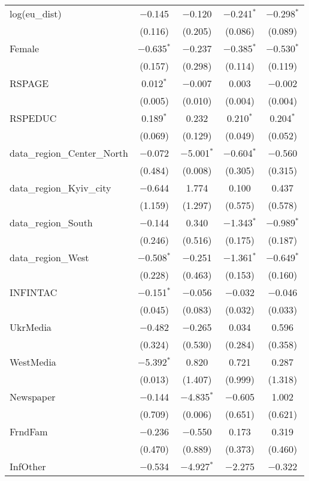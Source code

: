 \begin{table}[!htbp]
\begin{tabular}{@{\extracolsep{1pt}}lcccc}
  log(eu\_dist) & $-$0.145 & $-$0.120 & $-$0.241$^{*}$ & $-$0.298$^{*}$ \\ 
  & (0.116) & (0.205) & (0.086) & (0.089) \\ 
  Female & $-$0.635$^{*}$ & $-$0.237 & $-$0.385$^{*}$ & $-$0.530$^{*}$ \\ 
  & (0.157) & (0.298) & (0.114) & (0.119) \\ 
  RSPAGE & 0.012$^{*}$ & $-$0.007 & 0.003 & $-$0.002 \\ 
  & (0.005) & (0.010) & (0.004) & (0.004) \\ 
  RSPEDUC & 0.189$^{*}$ & 0.232 & 0.210$^{*}$ & 0.204$^{*}$ \\ 
  & (0.069) & (0.129) & (0.049) & (0.052) \\ 
  data\_region\_Center\_North & $-$0.072 & $-$5.001$^{*}$ & $-$0.604$^{*}$ & $-$0.560 \\ 
  & (0.484) & (0.008) & (0.305) & (0.315) \\ 
  data\_region\_Kyiv\_city & $-$0.644 & 1.774 & 0.100 & 0.437 \\ 
  & (1.159) & (1.297) & (0.575) & (0.578) \\ 
  data\_region\_South & $-$0.144 & 0.340 & $-$1.343$^{*}$ & $-$0.989$^{*}$ \\ 
  & (0.246) & (0.516) & (0.175) & (0.187) \\ 
  data\_region\_West & $-$0.508$^{*}$ & $-$0.251 & $-$1.361$^{*}$ & $-$0.649$^{*}$ \\ 
  & (0.228) & (0.463) & (0.153) & (0.160) \\ 
  INFINTAC & $-$0.151$^{*}$ & $-$0.056 & $-$0.032 & $-$0.046 \\ 
  & (0.045) & (0.083) & (0.032) & (0.033) \\ 
  UkrMedia & $-$0.482 & $-$0.265 & 0.034 & 0.596 \\ 
  & (0.324) & (0.530) & (0.284) & (0.358) \\ 
  WestMedia & $-$5.392$^{*}$ & 0.820 & 0.721 & 0.287 \\ 
  & (0.013) & (1.407) & (0.999) & (1.318) \\ 
  Newspaper & $-$0.144 & $-$4.835$^{*}$ & $-$0.605 & 1.002 \\ 
  & (0.709) & (0.006) & (0.651) & (0.621) \\ 
  FrndFam & $-$0.236 & $-$0.550 & 0.173 & 0.319 \\ 
  & (0.470) & (0.889) & (0.373) & (0.460) \\ 
  InfOther & $-$0.534 & $-$4.927$^{*}$ & $-$2.275 & $-$0.322 \\ 

\end{tabular}
\end{table}
